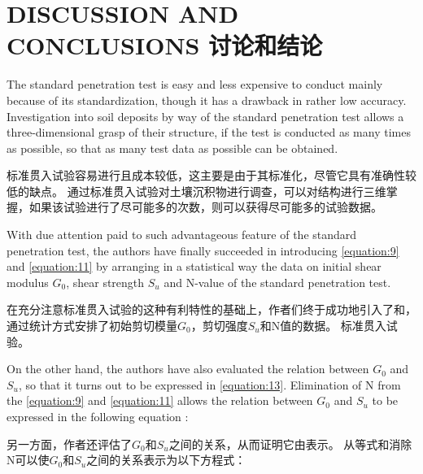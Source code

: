 \section{DISCUSSION AND CONCLUSIONS 讨论和结论}

\begin{paracol}{2}
    
    The standard penetration test is easy and less expensive to conduct mainly because of its standardization, though it has a drawback in rather low accuracy. Investigation into soil deposits by way of the standard penetration test allows a three-dimensional grasp of their structure, if the test is conducted as many times as possible, so that as many test data as possible can be obtained.

    \switchcolumn

    标准贯入试验容易进行且成本较低，这主要是由于其标准化，尽管它具有准确性较低的缺点。 通过标准贯入试验对土壤沉积物进行调查，可以对结构进行三维掌握，如果该试验进行了尽可能多的次数，则可以获得尽可能多的试验数据。  
    
    \switchcolumn*

    With due attention paid to such advantageous feature of the standard penetration test, the authors have finally succeeded in introducing \autoref{equation:9} and \autoref{equation:11} by arranging in a statistical way the data on initial shear modulus $G_0$, shear strength $S_u$ and N-value of the standard penetration test.
    
    \switchcolumn
       
    在充分注意标准贯入试验的这种有利特性的基础上，作者们终于成功地引入了和，通过统计方式安排了初始剪切模量$G_0$，剪切强度$S_u$和N值的数据。 标准贯入试验。      
    \switchcolumn*

    On the other hand, the authors have also evaluated the relation between $G_0$ and $S_u$, so that it turns out to be expressed in \autoref{equation:13}. Elimination of N from the \autoref{equation:9} and \autoref{equation:11} allows the relation between $G_0$ and $S_u$ to be expressed in the following equation :

    \switchcolumn
       
    另一方面，作者还评估了$G_0$和$S_u$之间的关系，从而证明它由表示。 从等式和消除N可以使$G_0$和$S_u$之间的关系表示为以下方程式： 

\end{paracol}

